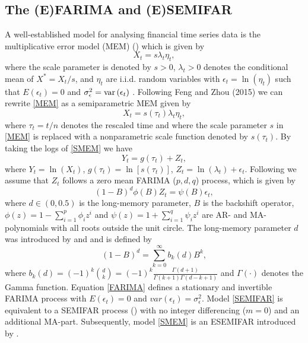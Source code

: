 \documentclass[12pt]{article}
\newcommand{\var}{\mbox{var\,}}
\begin{document}
\subsection{The (E)FARIMA and (E)SEMIFAR}
A well-established model for  analysing financial time series data is the multiplicative error model (MEM) (\cite{engle2002dynamic})  which is given by 
\begin{equation}
\label{MEM}
X_t=s \lambda_t \eta_t,
\end{equation}
where the scale parameter is denoted by $s >0$, $\lambda_t >0$ denotes the conditional mean of $X^*=X_t/s$, and $\eta_t$ are i.i.d. random variables with $\epsilon_t = \ln(\eta_t)$ such that $E(\epsilon_t) = 0$ and $\sigma^2_\epsilon = \var(\epsilon_t)$ . Following Feng and Zhou (2015) we can rewrite \eqref{MEM} as a semiparametric MEM given by
\begin{equation}
\label{SMEM}
X_t=s(\tau_t)\lambda_t \eta_t,
\end{equation}   
where $\tau_t=t/n$ denotes the rescaled time and where the scale parameter $s$ in \eqref{MEM} is replaced with a nonparametric scale function denoted by $s(\tau_t)$. 
By taking the logs of \eqref{SMEM} we have
\begin{equation}
\label{SEMIFAR}
Y_t=g(\tau_t) + Z_t,
\end{equation}
where $Y_t=\ln(X_t)$, $g(\tau_t)=\ln[s(\tau_t)]$, $Z_t=\ln(\lambda_t) + \epsilon_t$. %
Following \citet{beran2002semifar} we assume that $Z_t$ follows a zero mean FARIMA ($p, d, q$) process, which is given by
\begin{equation}
\label{FARIMA}
(1-B)^d\phi(B)Z_t =\psi(B)\epsilon_t,
\end{equation}
where $d \in (0,0.5)$ is the long-memory parameter, $B$ is the backshift operator, $\phi(z)=1-\sum_{i=1}^{p}\phi_iz^i$ and  $\psi(z)=1+\sum_{i=1}^{q}\psi_iz^i$ are AR- and MA-polynomials with all roots outside the unit circle. The long-memory parameter $d$ was introduced by \citet{granger1980introduction} and \citet{hosking1981fractional} and is defined by 
\begin{equation}
	\label{d}
	(1-B)^{d} = \sum_{k=0}^{\infty} b_k(d) B^k, 
\end{equation} 
where $b_k(d) = (-1)^{k}{d\choose k}  = (-1)^{k} \frac{\Gamma(d+1)}{\Gamma(k+1)\Gamma(d-k+1)}$ and $\Gamma(\cdot)$ denotes the Gamma function. Equation \eqref{FARIMA} defines a stationary and invertible FARIMA process with $E(\epsilon_t)=0$ and $var(\epsilon_t)=\sigma^2_{\epsilon}$. Model \eqref{SEMIFAR} is equivalent to a SEMIFAR process (\cite{beran2002semifar}) with no integer differencing ($m=0$) and an additional MA-part.
Subsequently, model \eqref{SMEM} is an ESEMIFAR introduced by \citet{beran2015modelling}.
\end{document}
